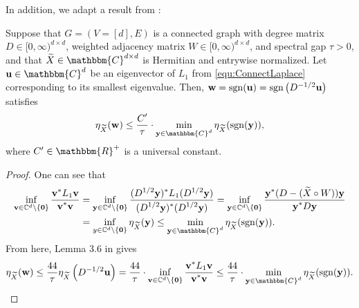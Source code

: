 

In addition, we adapt a result from \cite{Cheeger}:

\begin{lem}  
Suppose that $G = (V=[d], E)$ is a connected graph with degree matrix $D \in [0,\infty)^{d \times d}$, weighted adjacency matrix $W \in [0,\infty)^{d \times d}$, and spectral gap $\tau > 0$, and that $\tX \in \mathbbm{C}^{d \times d}$ is Hermitian and entrywise normalized.  Let ${\bf u} \in \mathbbm{C}^d$ be an eigenvector of $L_1$ from \eqref{equ:ConnectLaplace} corresponding to its smallest eigenvalue.  Then, ${\bf w} = \mathrm{sgn}({\bf u}) = \mathrm{sgn} \left( D^{-1/2}{\bf u} \right)$ satisfies \[\eta_{\tX}({\bf w}) \le \bigfrac{C'}{\tau} \cdot \min_{{\bf y} \in \mathbbm{C}^d} \eta_{\tX}( \sgn({\bf y}) ),\] where $C' \in \mathbbm{R}^+$ is a universal constant.
\label{lem:CheegerInequality}
\end{lem}

\begin{proof}  
 One can see that 
\begin{align*}
\inf_{{\bf v} \in \C^d \setminus \{ \bf 0 \}} \bigfrac{{\bf v}^* L_1 {\bf v}}{{\bf v}^* {\bf v}} &= \inf_{{\bf y} \in \C^d \setminus \{ \bf 0 \}} \bigfrac{(D^{1/2}{\bf y})^* L_1 (D^{1/2} {\bf y})}{(D^{1/2}{\bf y})^*(D^{1/2} {\bf y})} = \inf_{{\bf y} \in \C^d \setminus \{ \bf 0 \} } \bigfrac{{\bf y}^*(D - (\tX \circ W)){\bf y}}{{\bf y}^* D {\bf y} } \\
&= \inf_{y \in \C^d \setminus \{ \bf 0 \}} \eta_{\tX}({\bf y}) \le \min_{{\bf y} \in \mathbbm{C}^d} \eta_{\tX}( \sgn({\bf y}) ).  
\end{align*}
From here, Lemma 3.6 in \cite{Cheeger} gives \[\eta_{\tX}({\bf w}) \le \bigfrac{44}{\tau} \eta_{\tX}\left( D^{-1/2}{\bf u} \right) = \bigfrac{44}{\tau} \cdot \inf_{{\bf v} \in \C^d \setminus \{ \bf 0 \}} \bigfrac{{\bf v}^* L_1 {\bf v}}{{\bf v}^* {\bf v}} \le \bigfrac{44}{\tau} \cdot \min_{{\bf y} \in \mathbbm{C}^d} \eta_{\tX}( \sgn({\bf y}) ).\]
\end{proof}

